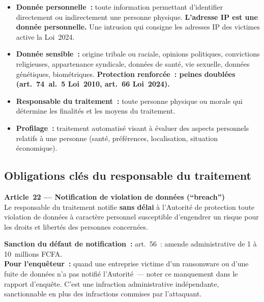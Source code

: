 \begin{itemize}
    \item \textbf{Donnée personnelle~:} toute information permettant
          d'identifier directement ou indirectement une personne physique.
          \textbf{L'adresse IP est une donnée personnelle.} Une intrusion
          qui consigne les adresses IP des victimes active la Loi~2024.
    \item \textbf{Donnée sensible~:} origine tribale ou raciale, opinions
          politiques, convictions religieuses, appartenance syndicale,
          données de santé, vie sexuelle, données génétiques, biométriques.
          \textbf{Protection renforcée~: peines doublées (art.~74~al.~5
          Loi~2010, art.~66 Loi~2024).}
    \item \textbf{Responsable du traitement~:} toute personne physique
          ou morale qui détermine les finalités et les moyens du traitement.
    \item \textbf{Profilage~:} traitement automatisé visant à évaluer des
          aspects personnels relatifs à une personne (santé, préférences,
          localisation, situation économique).
\end{itemize}

\subsection{Obligations clés du responsable du traitement}

\begin{boxjuris}
\textbf{Article~22 --- Notification de violation de données (``breach'')}\\
Le responsable du traitement notifie \textbf{sans délai} à l'Autorité de
protection toute violation de données à caractère personnel susceptible
d'engendrer un risque pour les droits et libertés des personnes concernées.

\textbf{Sanction du défaut de notification~:} art.~56~: amende
administrative de 1 à 10~millions FCFA.\\[0.3ex]
\textbf{Pour l'enquêteur~:} quand une entreprise victime d'un ransomware
ou d'une fuite de données n'a pas notifié l'Autorité~--- noter ce manquement
dans le rapport d'enquête. C'est une infraction administrative indépendante,
sanctionnable en plus des infractions commises par l'attaquant.
\end{boxjuris}

